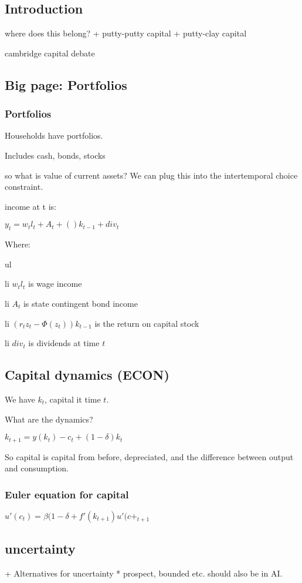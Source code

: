 
\subsection{Introduction}


where does this belong?
+ putty-putty capital
+ putty-clay capital

cambridge capital debate
\subsection{Big page: Portfolios}
\subsubsection{Portfolios}
Households have portfolios.

Includes cash, bonds, stocks

so what is value of current assets? We can plug this into the intertemporal choice constraint.

income at t is:

\(y_t=w_tl_t+A_t+()k_{t-1}+div_t\)

Where:

ul

li \(w_tl_t\) is wage income

li \(A_t\) is state contingent bond income

li \((r_tz_t-\Phi (z_t))k_{t-1}\) is the return on capital stock

li \(div_t\) is dividends at time \(t\)

\subsection{Capital dynamics (ECON)}
We have \(k_t\), capital it time \(t\).

What are the dynamics?

\(k_{t+1}=y(k_t)-c_t+(1-\delta )k_t\)

So capital is capital from before, depreciated, and the difference between output and consumption.
\subsubsection{Euler equation for capital}

\(u'(c_t)=\beta (1-\delta +f'(k_{t+1})u'(c+_{t+1}\)

\subsection{uncertainty}
+ Alternatives for uncertainty
  * prospect, bounded etc. should also be in AI.

